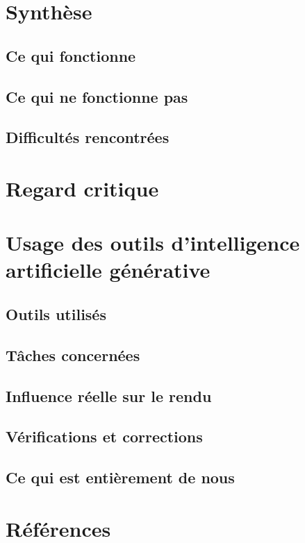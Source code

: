 \documentclass[11pt,a4paper]{report}
\begin{document}
\chapter{Synthèse}
\section{Ce qui fonctionne}
\section{Ce qui ne fonctionne pas}
\section{Difficultés rencontrées}

\chapter{Regard critique}

\chapter{Usage des outils d'intelligence artificielle générative}
\section{Outils utilisés}
\section{Tâches concernées}
\section{Influence réelle sur le rendu}
\section{Vérifications et corrections}
\section{Ce qui est entièrement de nous}

\chapter*{Références}
\end{document}
